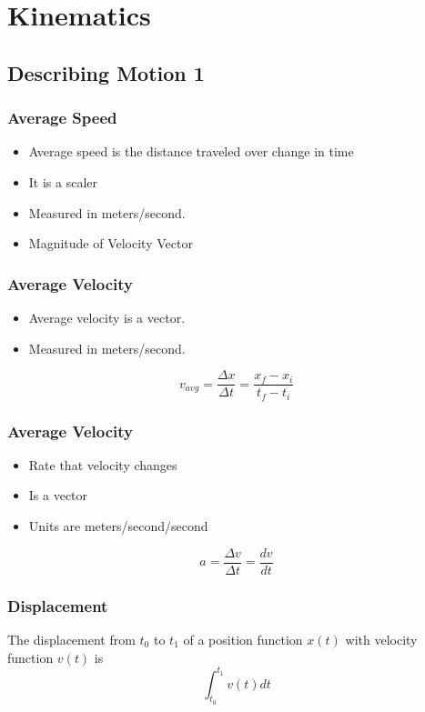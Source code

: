\documentclass[../Notes.tex]{subfiles}
\begin{document}
\section{Kinematics}
\subsection{Describing Motion 1}

\subsubsection{Average Speed}
\begin{itemize}
	\item Average speed is the distance traveled over change in time
	\item It is a scaler
	\item Measured in meters/second.
	\item Magnitude of Velocity Vector
\end{itemize}

\subsubsection{Average Velocity}
\begin{itemize}
	\item Average velocity is a vector.
	\item Measured in meters/second.
\end{itemize}
\begin{equation*}
v_{avg} = \frac{\Delta x}{\Delta t} = \frac{x_f - x_i}{t_f - t_i}
\end{equation*}

\subsubsection{Average Velocity}
\begin{itemize}
	\item Rate that velocity changes
	\item Is a vector
	\item Units are meters/second/second
\end{itemize}
\begin{equation*}
a = \frac{\Delta v}{\Delta t} = \frac{dv}{dt}
\end{equation*}

\subsubsection{Displacement}
The displacement from $t_0$ to $t_1$ of a position function $x(t)$ with velocity function $v(t)$ is
\begin{equation*} 
\int_{t_0}^{t_1} v(t)dt
\end{equation*} 
\end{document}
